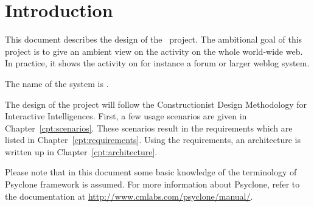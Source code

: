 \chapter{Introduction}

This document describes the design of the \AmbE\ project. The ambitional goal
of this project is to give an ambient view on the activity on the whole
world-wide web. In practice, it shows the activity on for instance a forum or
larger weblog system.

The name of the system is \Amber{}.

The design of the project will follow the Constructionist Design Methodology
for Interactive Intelligences\cite{CDM}. First, a few usage scenarios are given
in Chapter~\ref{cpt:scenarios}. These scenarios result in the requirements
which are listed in Chapter~\ref{cpt:requirements}. Using the requirements, an
architecture is written up in Chapter~\ref{cpt:architecture}.

Please note that in this document some basic knowledge of the terminology of
Psyclone framework is assumed. For more information about Psyclone, refer to
the documentation at \url{http://www.cmlabs.com/psyclone/manual/}.
